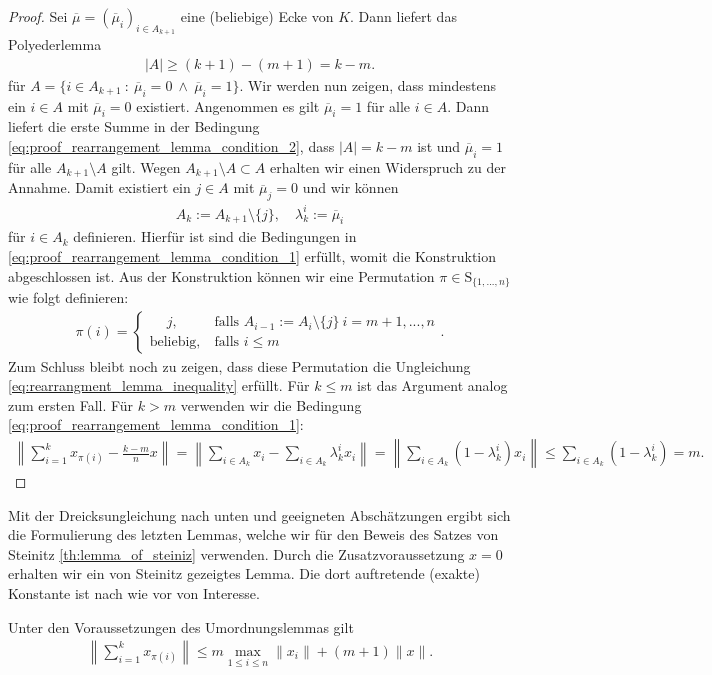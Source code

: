 \begin{proof}
	Sei $ \overline{\mu} = (\overline{\mu}_i)_{i \in A_{k+1}} $ eine (beliebige) Ecke von $ K $. 
	Dann liefert das Polyederlemma
	\begin{align*}
		| A | \geq (k+1) - (m+1 ) = k - m.
	\end{align*}
	für $ A = \{i \in A_{k+1} \ : \ \overline{\mu}_i = 0 \ \wedge \ \overline{\mu}_i = 1\} $.
	Wir werden nun zeigen, dass mindestens ein $ i \in A $ mit $ \overline{\mu}_i = 0 $ existiert.
	Angenommen es gilt $ \overline{\mu}_i = 1 $ für alle $ i \in A $.
	Dann liefert die erste Summe in der Bedingung \eqref{eq:proof_rearrangement_lemma_condition_2},
	dass $ |A | = k - m $ ist und $ \overline{\mu}_i = 1 $ für alle $ A_{k+1}\setminus A $ gilt. Wegen $ A_{k+1 } \setminus A \subset A $ erhalten wir einen Widerspruch zu der Annahme.
	Damit existiert ein $ j \in A $ mit $ \overline{\mu}_j = 0 $ und wir können
	\begin{align*}
		A_k := A_{k+1} \setminus \{j\}, \quad \lambda_k^i := \overline{\mu}_i
	\end{align*}
	für $ i \in A_k $ definieren. Hierfür ist sind die Bedingungen in \eqref{eq:proof_rearrangement_lemma_condition_1} erfüllt, womit die Konstruktion abgeschlossen ist.
	Aus der Konstruktion können wir eine Permutation $ \pi \in \mathrm{S}_{\{1,...,n\}} $ wie folgt definieren:
	\begin{align*}
		\pi(i)
		=
		\begin{cases}
			\ \quad j, &\ \text{falls } A_{i-1} := A_i \setminus \{j\} \  i = m+1,...,n\\
			\textrm{beliebig}, &\ \text{falls } i \leq m
		\end{cases}.
	\end{align*}
	Zum Schluss bleibt noch zu zeigen, dass diese Permutation die Ungleichung \eqref{eq:rearrangment_lemma_inequality} erfüllt.
	Für $ k \leq m  $ ist das Argument analog zum ersten Fall.
	Für $ k > m  $ verwenden wir die Bedingung \eqref{eq:proof_rearrangement_lemma_condition_1}:
	\begin{align*}
		\left\|
		\sum \limits_{i = 1}^k x_{\pi(i)} - \frac{k-m}{n} x 
		\right\|
		=
		\left\|
		\sum \limits_{i \in A_k} x_{i} - \sum \limits_{i \in A_k} \lambda_k^ix_{i} 
		\right\|
		=
		\left\|
		\sum \limits_{i \in A_k} ( 1 - \lambda_k^i )x_{i} 
		\right\|
		\leq
		\sum \limits_{i \in A_k} ( 1 - \lambda_k^i ) 
		= m.
	\end{align*}
\end{proof}
Mit der Dreicksungleichung nach unten und geeigneten Abschätzungen ergibt sich die Formulierung des letzten Lemmas, welche wir für den Beweis des Satzes von Steinitz \ref{th:lemma_of_steiniz} verwenden. Durch die Zusatzvoraussetzung $ x = 0 $ erhalten wir ein von Steinitz gezeigtes Lemma.
Die dort auftretende (exakte) Konstante ist nach wie vor von Interesse.
\begin{kor}\label{th:rearrangement_lemma_kor}
	Unter den Voraussetzungen des Umordnungslemmas gilt
	\begin{align}
		\left\| \sum \limits_{i = 1}^k x_{\pi(i)} \right\|
		\leq m \max_{1 \leq i \leq n} \|x_i\| + (m+1) \|x\|.
	\end{align}
\end{kor}

